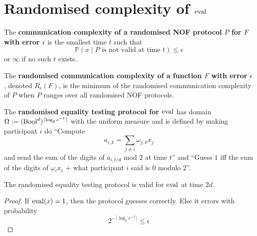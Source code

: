 \chapter{Randomised complexity of \texorpdfstring{$\operatorname{eval}$}{eval}}

\begin{definition}
  \label{def:rand-protocol-complex}

  The {\bf communication complexity of a randomised NOF protocol $P$ for $F$ with error $\epsilon$} is the smallest time $t$ such that
  $$\mathbb P(x \mid P \text{ is not valid at time } t) \le \epsilon$$
  or $\infty$ if no such $t$ exists.
\end{definition}

\begin{definition}
  \label{def:rand-complex}

  The {\bf randomised communication complexity of a function $F$ with error $\epsilon$}, denoted $R_\epsilon(F)$, is the minimum of the randomised communication complexity of $P$ when $P$ ranges over all randomised NOF protocols.
\end{definition}

\begin{definition}
  \label{def:rand-eq-test-protocol-eval}

  The {\bf randomised equality testing protocol for $\operatorname{eval}$} has domain $\Omega := (\operatorname{Bool}^d)^{\lceil\log_2\epsilon^{-1}\rceil}$ with the uniform measure and is defined by making participant $i$ do ``Compute $$a_{i, k} = \sum_{j \ne i} \omega_{j, k}x_j$$ and send the sum of the digits of $a_{i, t/d}$ mod $2$ at time $t$'' and ``Guess $1$ iff the sum of the digits of $\omega_i x_i$ + what participant $i$ said is $0$ modulo $2$''.
\end{definition}

\begin{lemma}
  \label{lem:rand-eq-test-protocol-eval-valid}

  The randomised equality testing protocol is valid for $\operatorname{eval}$ at time $2d$.
\end{lemma}
\begin{proof}

  If $\operatorname{eval}(x) = 1$, then the protocol guesses correctly. Else it errors with probability
  $$2^{-\lceil{\log_2\epsilon^{-1}}\rceil} \le \epsilon$$
\end{proof}

